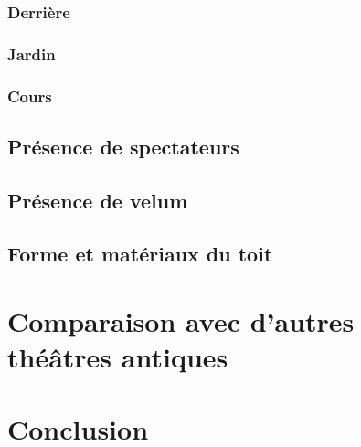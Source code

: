 			\subsection{Derrière}
			\subsection{Jardin}
			\subsection{Cours}
		\section{Présence de spectateurs}
		\section{Présence de velum}
		\section{Forme et matériaux du toit}
		
		\newpage

	\chapter{Comparaison avec d'autres théâtres antiques}
		\citationChap{
		}{}
		\minitoc
		\newpage
	
	\chapter*{Conclusion}
	
		\newpage
		
 
 
